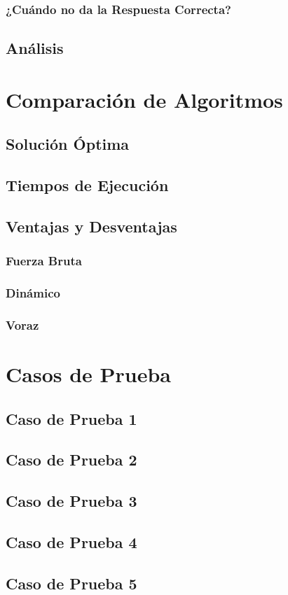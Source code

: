 \documentclass[11pt,letter]{article}
\begin{document}
\subsubsection{¿Cuándo no da la Respuesta Correcta?}
\subsection{Análisis}


\newpage

\section{Comparación de Algoritmos}
\subsection{Solución Óptima}
\subsection{Tiempos de Ejecución}
\subsection{Ventajas y Desventajas}
\subsubsection{Fuerza Bruta}
\subsubsection{Dinámico}
\subsubsection{Voraz}

\newpage

\section{Casos de Prueba}
\subsection{Caso de Prueba 1}
\subsection{Caso de Prueba 2}
\subsection{Caso de Prueba 3}
\subsection{Caso de Prueba 4}
\subsection{Caso de Prueba 5}
\end{document}
